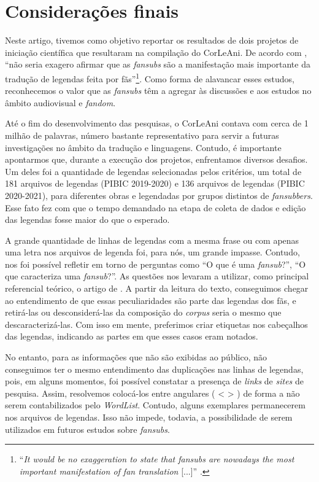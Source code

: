 \documentclass[portuguese]{textolivre}
\begin{document}
\section{Considerações finais}\label{sec-secoes}
Neste artigo, tivemos como objetivo reportar os resultados de dois projetos de iniciação científica que resultaram na compilação do CorLeAni. De acordo com \textcite[p. 1]{diaz-cintas_fansubs:_2006}, “não seria exagero afirmar que as \textit{fansubs} são a manifestação mais importante da tradução de legendas feita por fãs”\footnote{“\textit{It would be no exaggeration to state that fansubs are nowadays the most important manifestation of fan translation} [...]” \cite[p. 1, tradução nossa]{diaz-cintas_fansubs:_2006}.}. Como forma de alavancar esses estudos, reconhecemos o valor que as \textit{fansubs} têm a agregar às discussões e aos estudos no âmbito audiovisual e \textit{fandom}. 

Até o fim do desenvolvimento das pesquisas, o CorLeAni contava com cerca de 1 milhão de palavras, número bastante representativo para servir a futuras investigações no âmbito da tradução e linguagens. Contudo, é importante apontarmos que, durante a execução dos projetos, enfrentamos diversos desafios. Um deles foi a quantidade de legendas selecionadas pelos critérios, um total de 181 arquivos de legendas (PIBIC 2019-2020) e 136 arquivos de legendas (PIBIC 2020-2021), para diferentes obras e legendadas por grupos distintos de \textit{fansubbers}. Esse fato fez com que o tempo demandado na etapa de coleta de dados e edição das legendas fosse maior do que o esperado.

A grande quantidade de linhas de legendas com a mesma frase ou com apenas uma letra nos arquivos de legenda foi, para nós, um grande impasse. Contudo, nos foi possível refletir em torno de perguntas como “O que é uma \textit{fansub}?”, “O que caracteriza uma \textit{fansub}?”. As questões nos levaram a utilizar, como principal referencial teórico, o artigo de \textcite{diaz-cintas_fansubs:_2006}. A partir da leitura do texto, conseguimos chegar ao entendimento de que essas peculiaridades são parte das legendas dos fãs, e retirá-las ou desconsiderá-las da composição do \textit{corpus} seria o mesmo que descaracterizá-las. Com isso em mente, preferimos criar etiquetas nos cabeçalhos das legendas, indicando as partes em que esses casos eram notados.

No entanto, para as informações que não são exibidas ao público, não conseguimos ter o mesmo entendimento das duplicações nas linhas de legendas, pois, em alguns momentos, foi possível constatar a presença de \textit{links} de \textit{sites} de pesquisa. Assim, resolvemos colocá-los entre angulares ( < > ) de forma a não serem contabilizados pelo \textit{WordList}. Contudo, alguns exemplares permanecerem nos arquivos de legendas. Isso não impede, todavia, a possibilidade de serem utilizados em futuros estudos sobre \textit{fansubs}.
\end{document}
